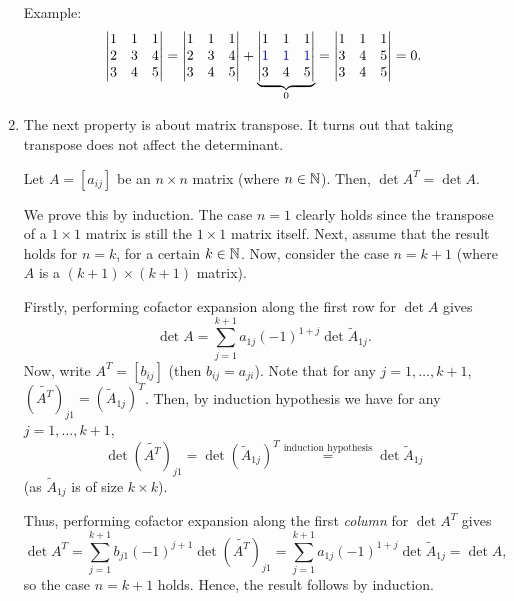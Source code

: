 \begin{enumerate}
Example:
\[
\mqty|1&1&1\\ 2&3&4\\ 3&4&5|
=\mqty|1&1&1\\ 2&3&4\\ 3&4&5|+\underbrace{\mqty|1&1&1\\ \blc{1}&\blc{1}&\blc{1}\\ 3&4&5|}_{0}
=\mqty|1&1&1\\ 3&4&5\\ 3&4&5|
=0.
\]
\item The next property is about matrix transpose. It turns out that taking
transpose does not affect the determinant.
\begin{proposition}
\label{prp:trans-not-affect-det}
Let \(A=[a_{ij}]\) be an \(n\times n\) matrix (where \(n\in\mathbb{N}\)). Then, \(\det
A^{T}=\det A\).
\end{proposition}
\begin{pf}
We prove this by induction. The case \(n=1\) clearly holds since the transpose
of a \(1\times 1\) matrix is still the \(1\times 1\) matrix itself. Next,
assume that the result holds for \(n=k\), for a certain \(k\in\mathbb{N}\). Now,
consider the case \(n=k+1\) (where \(A\) is a \((k+1)\times (k+1)\) matrix).

Firstly, performing cofactor expansion along the first row for \(\det A\) gives
\[
\det A=\sum_{j=1}^{k+1}a_{1j}(-1)^{1+j}\det\widetilde{A}_{1j}.
\]
Now, write \(A^{T}=[b_{ij}]\) (then \(b_{ij}=a_{ji}\)). Note that for any \(j=1,\dotsc,k+1\),
\((\widetilde{A^{T}})_{j1}=(\widetilde{A}_{1j})^{T}\). Then, by induction
hypothesis we have for any \(j=1,\dotsc,k+1\),
\[
\det (\widetilde{A^{T}})_{j1}
=\det (\widetilde{A}_{1j})^{T}
\overset{\text{induction hypothesis}}{=}\det \widetilde{A}_{1j}
\]
(as \(\widetilde{A}_{1j}\) is of size \(k\times k\)).

Thus, performing cofactor expansion along the first \emph{column} for \(\det
A^{T}\) gives
\[
\det A^{T}
=\sum_{j=1}^{k+1}b_{j1}(-1)^{j+1}\det (\widetilde{A^{T}})_{j1}
=\sum_{j=1}^{k+1}a_{1j}(-1)^{1+j}\det \widetilde{A}_{1j}
=\det A,
\]
so the case \(n=k+1\) holds. Hence, the result follows by induction.
\end{pf}


\end{enumerate}

